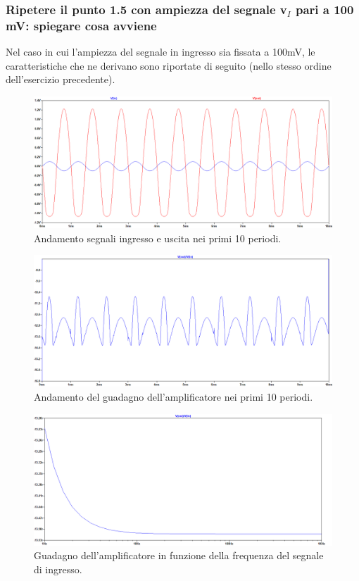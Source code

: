 \documentclass[a4paper,10pt]{article}
\begin{document}
\subsubsection{Ripetere il punto 1.5 con ampiezza del segnale v$_I$ pari a 100 mV: spiegare cosa avviene}
Nel caso in cui l'ampiezza del segnale in ingresso sia fissata a 100mV, le caratteristiche che ne derivano sono riportate di seguito (nello stesso ordine dell'esercizio precedente).
\begin{figure}[h!]
  	\centering
 	\includegraphics[width=0.67\linewidth]{es2-1-6inout.png}
  	\caption{Andamento segnali ingresso e uscita nei primi 10 periodi.}
  	\label{fig:inout2}
\end{figure}
\begin{figure}[h!]
  	\centering
 	\includegraphics[width=0.67\linewidth]{es2-1-6.png}
  	\caption{Andamento del guadagno dell'amplificatore nei primi 10 periodi.}
  	\label{fig:gain100}
\end{figure}
\begin{figure}[h!]
  	\centering
 	\includegraphics[width=0.67\linewidth]{es2-1-6bis.png}
  	\caption{Guadagno dell'amplificatore in funzione della frequenza del segnale di ingresso.}
  	\label{fig:gainfreq2}
\end{figure}
\end{document}

